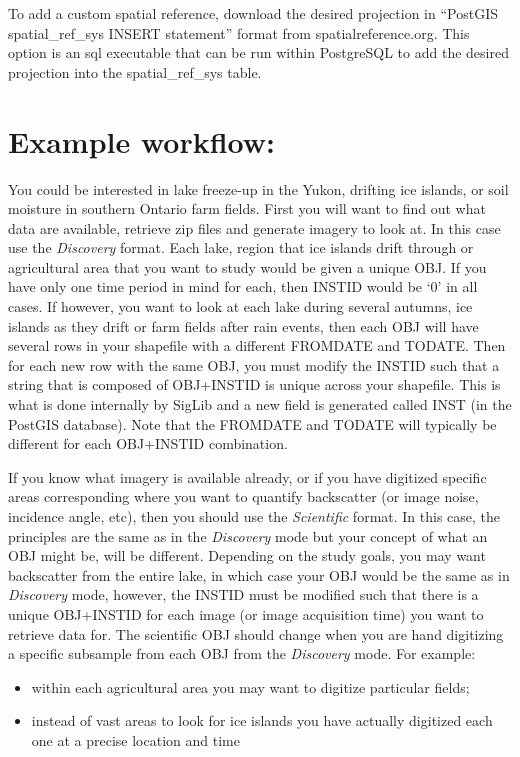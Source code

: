 \documentclass[letterpaper,10pt,openany,oneside]{sphinxmanual}
\begin{document}
To add a custom spatial reference, download the desired projection in ``PostGIS spatial\_ref\_sys INSERT statement'' format from spatialreference.org. This option is an sql executable that can be run within PostgreSQL to add the desired projection into the spatial\_ref\_sys table.


\section{Example workflow:}
\label{project:example-workflow}
You could be interested in lake freeze-up in the Yukon, drifting ice
islands, or soil moisture in southern Ontario farm fields. First you
will want to find out what data are available, retrieve zip files and
generate imagery to look at. In this case use the \emph{Discovery} format.
Each lake, region that ice islands drift through or agricultural area
that you want to study would be given a unique OBJ. If you have only one
time period in mind for each, then INSTID would be `0' in all cases. If
however, you want to look at each lake during several autumns, ice
islands as they drift or farm fields after rain events, then each OBJ
will have several rows in your shapefile with a different FROMDATE and
TODATE. Then for each new row with the same OBJ, you must modify the
INSTID such that a string that is composed of OBJ+INSTID is unique
across your shapefile. This is what is done internally by SigLib and a
new field is generated called INST (in the PostGIS database). Note that
the FROMDATE and TODATE will typically be different for each OBJ+INSTID
combination.

If you know what imagery is available already, or if you have digitized
specific areas corresponding where you want to quantify backscatter (or
image noise, incidence angle, etc), then you should use the \emph{Scientific}
format. In this case, the principles are the same as in the \emph{Discovery}
mode but your concept of what an OBJ might be, will be different.
Depending on the study goals, you may want backscatter from the entire
lake, in which case your OBJ would be the same as in \emph{Discovery} mode,
however, the INSTID must be modified such that there is a unique
OBJ+INSTID for each image (or image acquisition time) you want to
retrieve data for. The scientific OBJ should change when you are hand
digitizing a specific subsample from each OBJ from the \emph{Discovery} mode.
For example:
\begin{itemize}
\item {} 
within each agricultural area you may want to digitize particular
fields;

\item {} 
instead of vast areas to look for ice islands you have actually
digitized each one at a precise location and time

\end{itemize}
\end{document}
